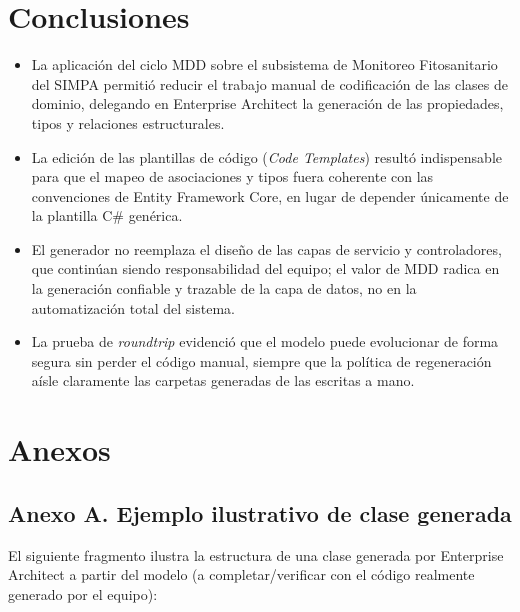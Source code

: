 \documentclass[11pt,a4paper]{article}
\begin{document}
	\section{Conclusiones}
	
	\begin{itemize}[nosep]
		\item La aplicación del ciclo MDD sobre el subsistema de Monitoreo Fitosanitario del SIMPA permitió reducir el trabajo manual de codificación de las clases de dominio, delegando en Enterprise Architect la generación de las propiedades, tipos y relaciones estructurales.
		\item La edición de las plantillas de código (\textit{Code Templates}) resultó indispensable para que el mapeo de asociaciones y tipos fuera coherente con las convenciones de Entity Framework Core, en lugar de depender únicamente de la plantilla C\# genérica.
		\item El generador no reemplaza el diseño de las capas de servicio y controladores, que continúan siendo responsabilidad del equipo; el valor de MDD radica en la generación confiable y trazable de la capa de datos, no en la automatización total del sistema.
		\item La prueba de \textit{roundtrip} evidenció que el modelo puede evolucionar de forma segura sin perder el código manual, siempre que la política de regeneración aísle claramente las carpetas generadas de las escritas a mano.
	\end{itemize}
	
	
	
	
	\newpage
	\section*{Anexos}
	
	\subsection*{Anexo A. Ejemplo ilustrativo de clase generada}
	El siguiente fragmento ilustra la estructura de una clase generada por Enterprise Architect a partir del modelo (a completar/verificar con el código realmente generado por el equipo):
	
\end{document}
